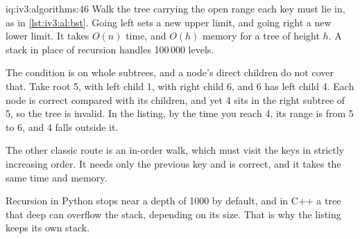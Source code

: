 \begin{solution}{iq:iv3:algorithms:46}
Walk the tree carrying the open range each key must lie in, as in \cref{lst:iv3:al:bst}. Going left sets a new upper limit, and going right a new lower limit. It takes $O(n)$ time, and $O(h)$ memory for a tree of height $h$. A stack in place of recursion handles 100\,000 levels.
\label{lst:iv3:al:bst}

The condition is on whole subtrees, and a node's direct children do not cover that. Take root 5, with left child 1, with right child 6, and 6 has left child 4. Each node is correct compared with its children, and yet 4 sits in the right subtree of 5, so the tree is invalid. In the listing, by the time you reach 4, its range is from 5 to 6, and 4 falls outside it.

The other classic route is an in-order walk, which must visit the keys in strictly increasing order. It needs only the previous key and is correct, and it takes the same time and memory.

Recursion in Python stops near a depth of 1000 by default, and in C++ a tree that deep can overflow the stack, depending on its size. That is why the listing keeps its own stack.

\end{solution}

